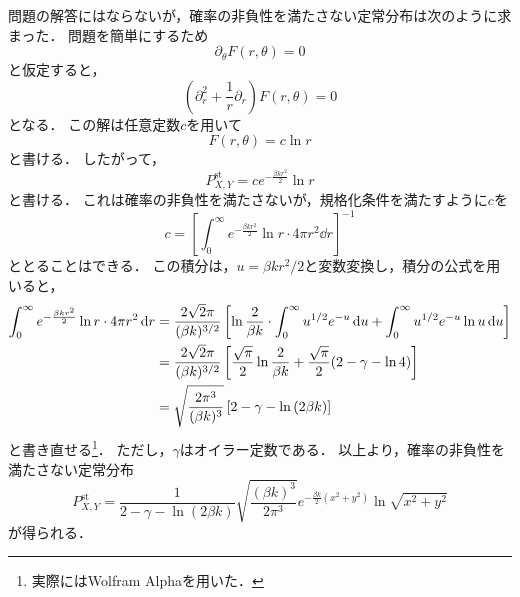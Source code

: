 \documentclass[a4paper,11pt]{jsarticle}
\begin{document}
問題の解答にはならないが，確率の非負性を満たさない定常分布は次のように求まった．
問題を簡単にするため
\begin{equation}
  \partial_{\theta} F(r,\theta) = 0
\end{equation}
と仮定すると，
\begin{equation}
  \left(\partial_r^2 + \frac{1}{r}\partial_r \right) F(r,\theta) = 0
\end{equation}
となる．
この解は任意定数$c$を用いて
\begin{equation}
  F(r,\theta) = c \ln{r}
\end{equation}
と書ける．
したがって，
\begin{equation}
  P_{X,Y}^{\mathrm{st}} = c e^{-\frac{\beta kr^2}{2}}\ln{r} 
\end{equation}
と書ける．
これは確率の非負性を満たさないが，規格化条件を満たすように$c$を
\begin{equation}
  c= \left[\int_0^{\infty} e^{-\frac{\beta kr^2}{2}}\ln{r} \cdot 4\pi r^2 \dd{r}\right]^{-1}
\end{equation}
ととることはできる．
この積分は，$u=\beta k r^2/2$と変数変換し，積分の公式を用いると，
\begin{align}
  \int_0^{\infty} e^{-\frac{\beta kr^2}{2}}\ln{r} \cdot 4\pi r^2 \dd{r} 
  &= \frac{2\sqrt{2}\pi}{(\beta k)^{3/2}} \left[\ln{\frac{2}{\beta k}}\cdot\int_0^{\infty} u^{1/2}e^{-u} \dd{u} + \int_0^{\infty} u^{1/2} e^{-u} \ln{u} \dd{u} \right] \notag\\
  &= \frac{2\sqrt{2}\pi}{(\beta k)^{3/2}} \left[\frac{\sqrt{\pi}}{2}\ln{\frac{2}{\beta k}} + \frac{\sqrt{\pi}}{2} (2 -\gamma - \ln{4}) \right] \notag\\
  &= \sqrt{\frac{2\pi^3}{(\beta k)^3}} \left[2 -\gamma - \ln{(2\beta k)} \right]
\end{align}
と書き直せる\footnote{実際にはWolfram Alphaを用いた．}．
ただし，$\gamma$はオイラー定数である．
以上より，確率の非負性を満たさない定常分布
\begin{equation}
  P_{X,Y}^{\mathrm{st}} = \frac{1}{2 -\gamma - \ln{(2\beta k)}}\sqrt{\frac{(\beta k)^3}{2\pi^3}}  e^{-\frac{\beta k}{2}(x^2+y^2)}\ln{\sqrt{x^2+y^2}} 
\end{equation}
が得られる．
\end{document}
